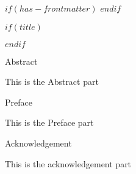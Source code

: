$if(has-frontmatter)$
\frontmatter
$endif$

$if(title)$
\maketitle
$endif$

\newpage


\begin{center}
\Large{Abstract}
\end{center}

\vspace*{\baselineskip}

This is the Abstract part

\newpage


\begin{center}
\Large{Preface}
\end{center}

\vspace*{\baselineskip}

This is the Preface part

\newpage


\begin{center}
\Large{Acknowledgement}
\end{center}

\vspace*{\baselineskip}

This is the acknowledgement part

\newpage
